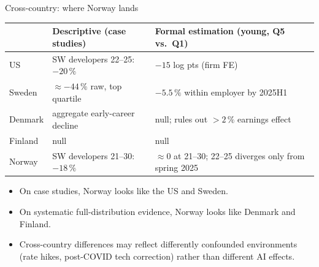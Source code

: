 
\begin{frame}{Cross-country: where Norway lands}
\footnotesize
\setlength{\tabcolsep}{5pt}
\begin{tabular}{l p{5.2cm} p{5.6cm}}
\toprule
 & Descriptive (case studies) & Formal estimation (young, Q5 vs.\ Q1) \\
\midrule
US      & SW developers 22--25: $-20\,\%$          & $-15$ log pts (firm FE) \\
Sweden  & $\approx -44\,\%$ raw, top quartile      & $-5.5\,\%$ within employer by 2025H1 \\
Denmark & aggregate early-career decline           & null; rules out $>2\,\%$ earnings effect \\
Finland & null                                     & null \\
\midrule
Norway  & SW developers 21--30: $-18\,\%$          & $\approx 0$ at 21--30; 22--25 diverges only from spring 2025 \\
\bottomrule
\end{tabular}

\vspace{0.8em}
\begin{itemize}\setlength{\itemsep}{4pt}
  \item On case studies, Norway looks like the US and Sweden.
  \item On systematic full-distribution evidence, Norway looks like Denmark and Finland.
  \item Cross-country differences may reflect differently confounded environments (rate hikes, post-COVID tech correction) rather than different AI effects.
\end{itemize}
\end{frame}
